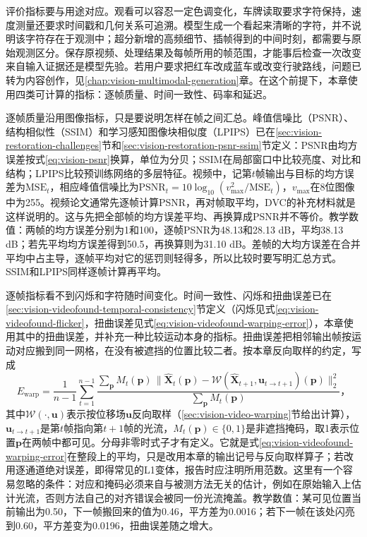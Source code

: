\label{sec:vision-video-content-cost}
评价指标要与用途对应。观看可以容忍一定色调变化，车牌读取要求字符保持，速度测量还要求时间戳和几何关系可追溯。模型生成一个看起来清晰的字符，并不说明该字符存在于观测中；超分新增的高频细节、插帧得到的中间时刻，都需要与原始观测区分。保存原视频、处理结果及每帧所用的帧范围，才能事后检查一次改变来自输入证据还是模型先验。若用户要求把红车改成蓝车或改变行驶路线，问题已转为内容创作，见\ref{chap:vision-multimodal-generation}章。在这个前提下，本章使用四类可计算的指标：逐帧质量、时间一致性、码率和延迟。

逐帧质量沿用图像指标，只是要说明怎样在帧之间汇总。峰值信噪比（PSNR）、结构相似性（SSIM）和学习感知图像块相似度（LPIPS）已在\ref{sec:vision-restoration-challenges}节和\ref{sec:vision-restoration-psnr-ssim}节定义：PSNR由均方误差按式\eqref{eq:vision-psnr}换算，单位为分贝；SSIM在局部窗口中比较亮度、对比和结构；LPIPS比较预训练网络的多层特征。视频中，记第$t$帧输出与目标的均方误差为$\mathrm{MSE}_t$，相应峰值信噪比为$\mathrm{PSNR}_t=10\log_{10}(v_{\max}^2/\mathrm{MSE}_t)$，$v_{\max}$在8位图像中为255。视频论文通常先逐帧计算PSNR，再对帧取平均，DVC的补充材料就是这样说明的。这与先把全部帧的均方误差平均、再换算成PSNR并不等价。教学数值：两帧的均方误差分别为1和100，逐帧PSNR为48.13和28.13 dB，平均38.13 dB；若先平均均方误差得到50.5，再换算则为31.10 dB。差帧的大均方误差在合并平均中占主导，逐帧平均对它的惩罚则轻得多，所以比较时要写明汇总方式。SSIM和LPIPS同样逐帧计算再平均。

逐帧指标看不到闪烁和字符随时间变化。时间一致性、闪烁和扭曲误差已在\ref{sec:vision-videofound-temporal-consistency}节定义（闪烁见式\eqref{eq:vision-videofound-flicker}，扭曲误差见式\eqref{eq:vision-videofound-warping-error}），本章使用其中的扭曲误差，并补充一种比较运动本身的指标。扭曲误差把相邻输出帧按运动对应搬到同一网格，在没有被遮挡的位置比较二者。按本章反向取样的约定，写成
\begin{equation}
  E_{\mathrm{warp}}=\frac{1}{n-1}\sum_{t=1}^{n-1}
  \frac{\sum_{\bm{p}}M_t(\bm{p})\,
    \bigl\lVert\widehat{\bm{X}}_t(\bm{p})
      -\mathcal{W}(\widehat{\bm{X}}_{t+1},\bm{u}_{t\to t+1})(\bm{p})\bigr\rVert_2^2}
  {\sum_{\bm{p}}M_t(\bm{p})}\text{，}
  \label{eq:vision-video-temporal-error}
\end{equation}
其中$\mathcal{W}(\cdot,\bm{u})$表示按位移场$\bm{u}$反向取样（\ref{sec:vision-video-warping}节给出计算），$\bm{u}_{t\to t+1}$是第$t$帧指向第$t+1$帧的光流，$M_t(\bm{p})\in\{0,1\}$是非遮挡掩码，取1表示位置$\bm{p}$在两帧中都可见。分母非零时式子才有定义。它就是式\eqref{eq:vision-videofound-warping-error}在整段上的平均，只是改用本章的输出记号与反向取样算子；若改用逐通道绝对误差，即得常见的L1变体，报告时应注明所用范数。这里有一个容易忽略的条件：对应和掩码必须来自与被测方法无关的估计，例如在原始输入上估计光流，否则方法自己的对齐错误会被同一份光流掩盖。教学数值：某可见位置当前输出为0.50，下一帧搬回来的值为0.46，平方差为0.0016；若下一帧在该处闪亮到0.60，平方差变为0.0196，扭曲误差随之增大。

